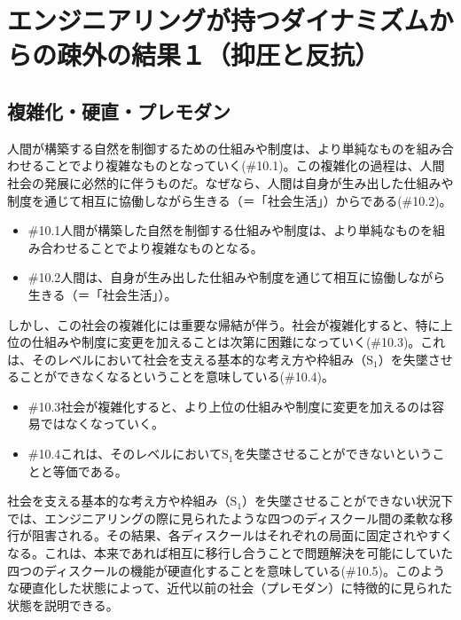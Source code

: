 \section{エンジニアリングが持つダイナミズムからの疎外の結果１（抑圧と反抗）}\label{ux30a8ux30f3ux30b8ux30cbux30a2ux30eaux30f3ux30b0ux304cux6301ux3064ux30c0ux30a4ux30caux30dfux30baux30e0ux304bux3089ux306eux758eux5916ux306eux7d50ux679cuxff11ux6291ux5727ux3068ux53cdux6297}

\subsection{複雑化・硬直・プレモダン}\label{ux8907ux96d1ux5316ux786cux76f4ux30d7ux30ecux30e2ux30c0ux30f3}

人間が構築する自然を制御するための仕組みや制度は、より単純なものを組み合わせることでより複雑なものとなっていく(\#10.1)。この複雑化の過程は、人間社会の発展に必然的に伴うものだ。なぜなら、人間は自身が生み出した仕組みや制度を通じて相互に協働しながら生きる（＝「社会生活」）からである(\#10.2)。

\begin{note}{}
  \begin{itemize}
    \tightlist
    \item{\#10.1}人間が構築した自然を制御する仕組みや制度は、より単純なものを組み合わせることでより複雑なものとなる。
    \item{\#10.2}人間は、自身が生み出した仕組みや制度を通じて相互に協働しながら生きる（＝「社会生活」）。
  \end{itemize}
\end{note}

しかし、この社会の複雑化には重要な帰結が伴う。社会が複雑化すると、特に上位の仕組みや制度に変更を加えることは次第に困難になっていく(\#10.3)。これは、そのレベルにおいて社会を支える基本的な考え方や枠組み（\(\textrm{S}_1\)）を失墜させることができなくなるということを意味している(\#10.4)。

\begin{note}{}
  \begin{itemize}
    \tightlist
    \item{\#10.3}社会が複雑化すると、より上位の仕組みや制度に変更を加えるのは容易ではなくなっていく。
    \item{\#10.4}これは、そのレベルにおいて$\textrm{S}_1$を失墜させることができないということと等価である。
  \end{itemize}
\end{note}

社会を支える基本的な考え方や枠組み（\(\textrm{S}_1\)）を失墜させることができない状況下では、エンジニアリングの際に見られたような四つのディスクール間の柔軟な移行が阻害される。その結果、各ディスクールはそれぞれの局面に固定されやすくなる。これは、本来であれば相互に移行し合うことで問題解決を可能にしていた四つのディスクールの機能が硬直化することを意味している(\#10.5)。このような硬直化した状態によって、近代以前の社会（プレモダン）に特徴的に見られた状態を説明できる。


